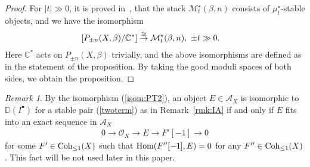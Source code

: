 \documentclass[11pt]{amsart}
\theoremstyle{plain}
\theoremstyle{definition}
\theoremstyle{remark}
\newtheorem{rmk}[thm]{Remark}
\newcommand{\aA}{\mathcal{A}}
\newcommand{\mM}{\mathcal{M}}
\newcommand{\oO}{\mathcal{O}}
\newcommand{\Hom}{\mathop{\rm Hom}\nolimits}
\newcommand{\Coh}{\mathop{\rm Coh}\nolimits}
\begin{document}
\begin{proof}
For $\lvert t \rvert \gg 0$, it is proved in~\cite[Theorem~3.21]{Tolim2}, 
\cite[Proposition~5.4]{Tsurvey}
that the stack $\mM_t^{\star}(\beta, n)$
consists of $\mu_t^{\star}$-stable 
objects, and 
we have the isomorphism
\begin{align}\notag
&[P_{\pm n}(X, \beta)/\mathbb{C}^{\ast}] \stackrel{\cong}{\to}
\mM_{t}^{\star}(\beta, n), \ \pm t \gg 0.
\end{align}
Here $\mathbb{C}^{\ast}$ acts on $P_{\pm n}(X, \beta)$ trivially, 
and the above isomorphisms
are defined as in the statement of the proposition. 
By taking the good moduli spaces of both sides, 
we obtain the proposition. 
\end{proof}
\begin{rmk}\label{rmk:dualpair}
By the isomorphism (\ref{isom:PT2}),
an object $E \in \aA_X$ is 
isomorphic to $\mathbb{D}(I^{\bullet})$
for a stable pair (\ref{twoterm}) 
as in Remark~\ref{rmk:IA} if and only if 
$E$ fits into an exact sequence in $\aA_X$
\begin{align*}
0 \to \oO_X \to E \to F'[-1] \to 0
\end{align*} 
for some $F' \in \Coh_{\le 1}(X)$
such that $\Hom(F''[-1], E)=0$ for any 
$F'' \in \Coh_{\le 1}(X)$. 
This fact will be not used later in this paper. 
\end{rmk}
\end{document}
